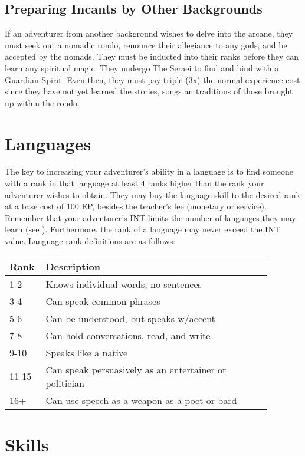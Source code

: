\subsection{Preparing Incants by Other Backgrounds}

If an adventurer from another background wishes to delve into the arcane, they must seek out a nomadic rondo, renounce their allegiance to any gods, and be accepted by the nomads. They must be inducted into their ranks before they can learn any spiritual magic. They undergo The Seraei to find and bind with a Guardian Spirit. Even then, they must pay triple (3x) the normal experience cost since they have not yet learned the stories, songs an traditions of those brought up within the rondo.

\section{Languages}
The key to increasing your adventurer's ability in a language is to find someone with a rank in that language at least 4 ranks higher than the rank your adventurer wishes to obtain. They may buy the language skill to the desired rank at a base cost of 100 EP, besides the teacher's fee (monetary or service). Remember that your adventurer's INT limits the number of languages they may learn (see ). Furthermore, the rank of a language may never exceed the INT value. Language rank definitions are as follows:

\begin{normboxc}

\small
\begin{tabular}{@{}p{0.085\linewidth} p{0.8\linewidth}}
\textbf{Rank} & \textbf{Description}\\
\midrule
1-2  & Knows individual words, no sentences\\
3-4  & Can speak common phrases\\
5-6  & Can be understood, but speaks w/accent\\
7-8  & Can hold conversations, read, and write\\
9-10  & Speaks like a native\\
11-15  & Can speak persuasively as an entertainer or politician\\
16+ & Can use speech as a weapon as a poet or bard
\end{tabular}
\end{normboxc}

\section{Skills}

